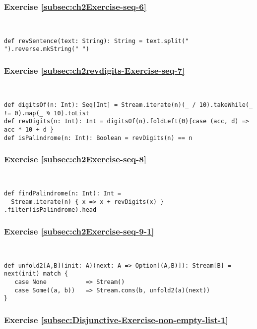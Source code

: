 \subsubsection*{Exercise \ref{subsec:ch2Exercise-seq-6}}

~
\begin{lstlisting}
def revSentence(text: String): String = text.split(" ").reverse.mkString(" ")
\end{lstlisting}


\subsubsection*{Exercise \ref{subsec:ch2revdigits-Exercise-seq-7}}

~
\begin{lstlisting}
def digitsOf(n: Int): Seq[Int] = Stream.iterate(n)(_ / 10).takeWhile(_ != 0).map(_ % 10).toList
def revDigits(n: Int): Int = digitsOf(n).foldLeft(0){case (acc, d) => acc * 10 + d }
def isPalindrome(n: Int): Boolean = revDigits(n) == n
\end{lstlisting}


\subsubsection*{Exercise \ref{subsec:ch2Exercise-seq-8}}

~
\begin{lstlisting}
def findPalindrome(n: Int): Int = 
  Stream.iterate(n) { x => x + revDigits(x) } .filter(isPalindrome).head
\end{lstlisting}


\subsubsection*{Exercise \ref{subsec:ch2Exercise-seq-9-1}}

~
\begin{lstlisting}
def unfold2[A,B](init: A)(next: A => Option[(A,B)]): Stream[B] = next(init) match {
   case None           => Stream()
   case Some((a, b))   => Stream.cons(b, unfold2(a)(next))
}
\end{lstlisting}



\subsubsection*{Exercise \ref{subsec:Disjunctive-Exercise-non-empty-list-1}}

